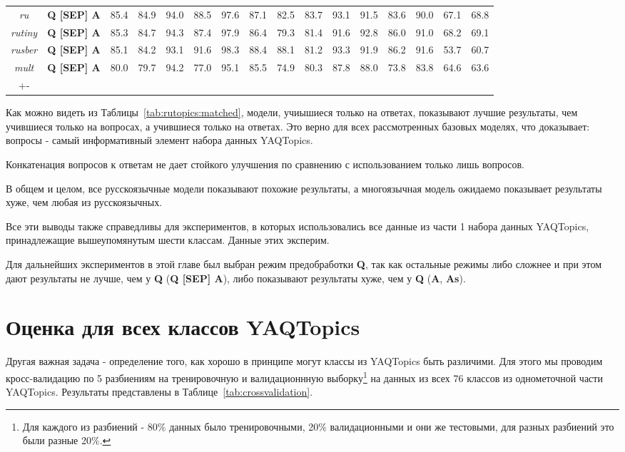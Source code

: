 \begin{table*}
{\begin{tabular}{|c|c||c|c|c|c|c|c|c|c|c|c|c|c|c|c|}
\textit{ru} &  \textbf{Q [SEP] A} & 85.4 & 84.9 & 94.0 & 88.5 & 97.6 & 87.1 & 82.5 & 83.7 & 93.1 & 91.5 & 83.6 & 90.0 & 67.1 & 68.8\\ %
\textit{rutiny} &  \textbf{Q [SEP] A} & 85.3 & 84.7 & 94.3 & 87.4 & 97.9 & 86.4 & 79.3 & 81.4 & 91.6 & 92.8 & 86.0 & 91.0 & 68.2 & 69.1\\ %
\textit{rusber} &  \textbf{Q [SEP] A} & 85.1 & 84.2 & 93.1 & 91.6 & 98.3 & 88.4 & 88.1 & 81.2 & 93.3 & 91.9 & 86.2 & 91.6 & 53.7 & 60.7\\ %
\textit{mult} &  \textbf{Q [SEP] A} & 80.0 & 79.7 & 94.2 & 77.0 & 95.1 & 85.5 & 74.9 & 80.3 & 87.8 & 88.0 & 73.8 & 83.8 & 64.6 & 63.6\\ \hline+-
\end{tabular}
}
\end{table*}

Как можно видеть из Таблицы~\ref{tab:rutopics:matched}, модели, учиышиеся только на ответах, показывают лучшие результаты, чем учившиеся только на вопросах, а учившиеся только на ответах. Это верно для всех рассмотренных базовых моделях, что доказывает: вопросы - самый информативный элемент набора данных {YAQTopics}. 

Конкатенация вопросов к ответам не дает стойкого улучшения по сравнению с использованием только лишь вопросов. 

В общем и целом, все русскоязычные модели показывают похожие результаты, а многоязычная модель ожидаемо показывает результаты хуже, чем любая из русскоязычных. 

Все эти выводы также справедливы для экспериментов, в которых использовались все данные из части 1 набора данных {YAQTopics}, принадлежащие вышеупомянутым шести классам. Данные этих эксперим.

Для дальнейших экспериментов в этой главе был выбран режим предобработки \textbf{Q}, так как остальные режимы либо сложнее и при этом дают результаты не лучше, чем у \textbf{Q} (\textbf{Q [SEP] A}), либо показывают результаты хуже, чем у \textbf{Q} (\textbf{A}, \textbf{As}).

\section{Оценка для всех классов {YAQTopics}}

Другая важная задача - определение того, как хорошо в принципе могут классы из {YAQTopics} быть различими. Для этого мы проводим кросс-валидацию по 5 разбиениям на тренировочную и валидационнную выборку\footnote{Для каждого из разбиений - 80\% данных было тренировочными, 20\% валидационными и они же тестовыми, для разных разбиений это были разные 20\%.} на данных из всех 76 классов из однометочной части  {YAQTopics}. Результаты представлены в Таблице~\ref{tab:crossvalidation}.


